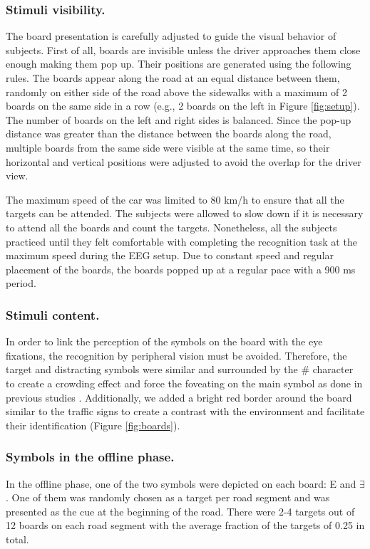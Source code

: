 \documentclass[12pt]{iopart}
\begin{document}
\subsubsection{Stimuli visibility.}
The board presentation is carefully adjusted to guide the visual behavior of subjects.
First of all, boards are invisible unless the driver approaches them
close enough making them pop up.
Their positions are generated using the following rules.
The boards appear along the road at an equal distance between them, 
randomly on either side of the road above the sidewalks
with a maximum of 2 boards
on the same side in a row  (e.g., 2 boards on the left in Figure \ref{fig:setup}). The number of boards on the left
and right sides is balanced. Since the pop-up distance was greater
than the distance between the boards along the road, multiple
boards from the same side were visible at the same time,
so their horizontal and vertical positions were adjusted to avoid
the overlap for the driver view.

The maximum speed of the car was limited to 80 km/h to ensure 
that all the targets
can be attended. The subjects were allowed to slow down if it is necessary
to attend all the boards and count the targets.
Nonetheless, all the subjects practiced until they felt comfortable 
with completing the recognition task at the maximum speed
during the EEG setup.
Due to constant speed and regular placement of the boards, the boards
popped up at a regular pace with a 900 ms period.

\subsubsection{Stimuli content.} In order to link the perception of the symbols on the board
with the eye fixations, the recognition by
peripheral vision must be avoided. Therefore, the target and distracting
symbols were similar and surrounded by the \# character to create
a crowding effect and force the foveating on the main symbol
as done in previous studies \cite{kamienkowski_fixation-related_2012}.
Additionally, we added a bright red border around the board similar 
to the traffic signs
to create a contrast with the environment and facilitate
their identification (Figure \ref{fig:boards}).

\subsubsection*{Symbols in the offline phase.}
In the offline phase, one of the two symbols were depicted on each board:
E and $\exists$.
One of them was randomly chosen as a target per road segment
and was presented as the cue
at the beginning of the road. There were 2-4 targets out of 12 boards
on each road segment with the average fraction of the targets of 0.25 in total.
\end{document}
